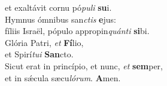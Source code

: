 \oddverse et exaltávit cornu pó\textit{pu}\textit{li} \textbf{su}i.\\
\evenverse Hymnus ómnibus san\textit{ctis} \textbf{e}jus:~\*\\
\evenverse fíliis Israël, pópulo appropin\textit{quán}\textit{ti} \textbf{si}bi.\\
\oddverse Glória Patri, \textit{et} \textbf{Fí}lio,~\*\\
\oddverse et Spirí\textit{tu}\textit{i} \textbf{San}cto.\\
\evenverse Sicut erat in princípio, et nunc, \textit{et} \textbf{sem}per,~\*\\
\evenverse et in sǽcula sæcu\textit{ló}\textit{rum}. \textbf{A}men.\\
